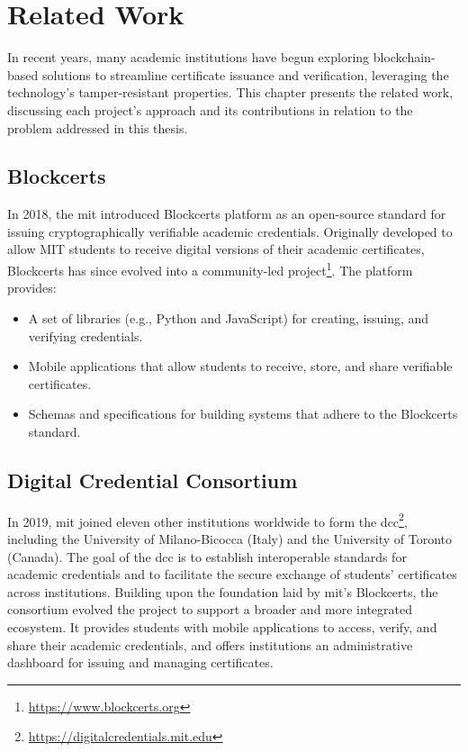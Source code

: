 \chapter{Related Work}
\label{chap:relatedWork}
In recent years, many academic institutions have begun exploring blockchain-based solutions to streamline certificate issuance and verification, leveraging the technology’s tamper-resistant properties. This chapter presents the related work, discussing each project's approach and its contributions in relation to the problem addressed in this thesis.

\section{Blockcerts}
In 2018, the \gls{mit} introduced Blockcerts platform  \cite{yassynzhanbolatzhan2021verificationuniversitystudent} as an open-source standard for issuing cryptographically verifiable academic credentials. Originally developed to allow MIT students to receive digital versions of their academic certificates, Blockcerts has since evolved into a community-led project\footnote{\url{https://www.blockcerts.org}}. The platform provides:
\begin{itemize}
    \item A set of libraries (e.g., Python and JavaScript) for creating, issuing, and verifying credentials.
    \item Mobile applications that allow students to receive, store, and share verifiable certificates.
    \item Schemas and specifications for building systems that adhere to the Blockcerts standard.
\end{itemize}

\section{Digital Credential Consortium}
In 2019, \gls{mit}  joined eleven other institutions worldwide to form the \gls{dcc}\footnote{\url{https://digitalcredentials.mit.edu}},  including the University of Milano-Bicocca (Italy) and the University of Toronto (Canada). The goal of the \gls{dcc} is to establish interoperable standards for academic credentials and to facilitate the secure exchange of students' certificates across institutions. 
Building upon the foundation laid by \gls{mit}’s Blockcerts, the consortium evolved the project to support a broader and more integrated ecosystem. It provides students with mobile applications to access, verify, and share their academic credentials, and offers institutions an administrative dashboard for issuing and managing certificates.

